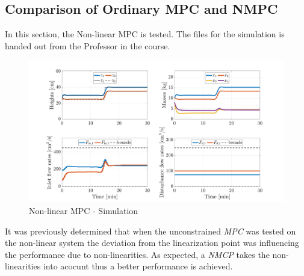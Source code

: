 \subsection{Comparison of Ordinary MPC and NMPC}
In this section, the Non-linear MPC is tested. The files for the simulation is handed out from the Professor in the course.
\begin{figure}[H]
    \centering
    \includegraphics[width=1\textwidth]{Figures/Pr11.5_NonLin_MPC.png}
    \caption{Non-linear MPC - Simulation}
\end{figure}
It was previously determined that when the unconstrained \textit{MPC} was tested on the non-linear system the deviation from the linearization point was influencing the performance due to non-linearities. As expected, a \textit{NMCP} takes the non-linearities into acocunt thus a better performance is achieved. 